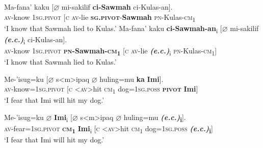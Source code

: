 \documentclass[10pt]{article}
\begin{document}
\begin{exe}
         
\begin{xlist}
       		\ex
 	 		\gll Ma-fana' kaku [$\varnothing$ mi-sakilif \textbf{ci-Sawmah} ci-Kulas-an].\\
\textsc{av}-know \textsc{1sg.pivot}  [\textsc{c} \textsc{av-}lie  \textbf{\textsc{sg.pivot}}-\textbf{Sawmah} \textsc{pn-}{Kulas}-\textsc{cm}\textsubscript{1}  \\
       \trans `I know that Sawmah lied to Kulas.'
 \ex
 		\gll Ma-fana' kaku \textbf{ci-Sawmah-an}\textsubscript{i} [$\varnothing$ mi-sakilif \textbf{\textit{(e.c.)}}\textsubscript{i} ci-Kulas-an].\\
             \textsc{av}-know \textsc{1sg.pivot} \textbf{\textsc{pn}-\textbf{Sawmah}-\textsc{\textbf{cm}\textsubscript{1}}} [\textsc{c} \textsc{av-}lie \textbf{\textit{(e.c.)}}\textsubscript{i} \textsc{pn}-Kulas-\textsc{cm}\textsubscript{1}]  \\
             \trans `I know that Sawmah lied to Kulas.'
            \end{xlist}
            \end{exe}
        
            
\begin{exe}
          \begin{xlist}
       		\ex
 		\gll Me-'isug=ku [$\varnothing$ s<m>ipaq $\varnothing$ huling=mu  \textbf{ka} \textbf{Imi}].\\
\textsc{av}-know=\textsc{1sg.pivot}  [\textsc{c} \textsc{<av>}hit \textsc{cm}\textsubscript{1} dog=\textsc{1sg.poss} {\textbf{\textsc{pivot}}} \textbf{Imi}] \\
            \trans `I fear that Imi will hit my dog.'
 
         \ex
 		\gll Me-'isug=ku \textbf{\textit{$\varnothing$}} \textbf{Imi}\textsubscript{i} [$\varnothing$ s<m>ipaq $\varnothing$ huling=mu \textbf{\textit{(e.c.)}\textsubscript{i}}].\\
             \textsc{av}-fear=\textsc{1sg.pivot} \textbf{\textsc{cm}\textsubscript{1}} \textbf{Imi}\textsubscript{i} [\textsc{c} \textsc{<av>}hit \textsc{cm}\textsubscript{1} dog=\textsc{1sg.poss} \textbf{\textit{(e.c.)}\textsubscript{i}}]  \\
             \trans `I fear that Imi will hit my dog.'
 	\end{xlist}
 \end{exe}
\end{document}
